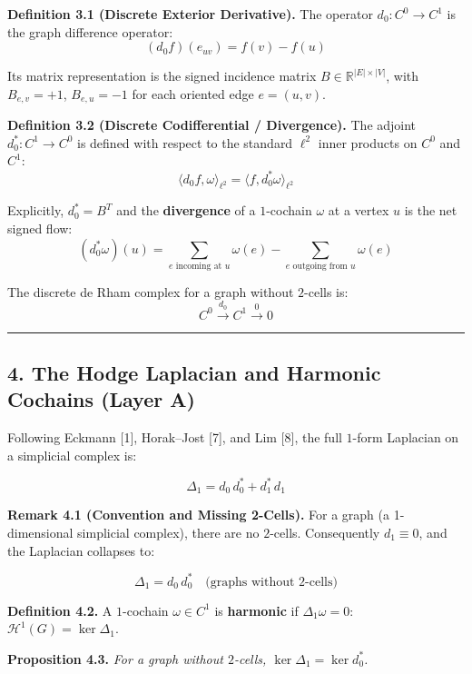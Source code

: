 \documentclass[
]{article}
\begin{document}
\textbf{Definition 3.1 (Discrete Exterior Derivative).} The operator
\(d_0 : C^0 \to C^1\) is the graph difference operator:
\[ (d_0 f)(e_{uv}) = f(v) - f(u) \]

Its matrix representation is the signed incidence matrix
\(B \in \mathbb{R}^{|E| \times |V|}\), with \(B_{e,v} = +1\),
\(B_{e,u} = -1\) for each oriented edge \(e = (u,v)\).

\textbf{Definition 3.2 (Discrete Codifferential / Divergence).} The
adjoint \(d_0^* : C^1 \to C^0\) is defined with respect to the standard
\(\ell^2\) inner products on \(C^0\) and \(C^1\):
\[ \langle d_0 f, \omega \rangle_{\ell^2} = \langle f, d_0^* \omega \rangle_{\ell^2} \]

Explicitly, \(d_0^* = B^T\) and the \textbf{divergence} of a
\(1\)-cochain \(\omega\) at a vertex \(u\) is the net signed flow:
\[ (d_0^* \omega)(u) = \sum_{e \text{ incoming at } u} \omega(e) - \sum_{e \text{ outgoing from } u} \omega(e) \]

The discrete de Rham complex for a graph without \(2\)-cells is:
\[ C^0 \xrightarrow{d_0} C^1 \xrightarrow{0} 0 \]

\begin{center}\rule{0.5\linewidth}{0.5pt}\end{center}

\subsection{\texorpdfstring{4. The Hodge Laplacian and Harmonic Cochains
\textbf{(Layer
A)}}{4. The Hodge Laplacian and Harmonic Cochains (Layer A)}}\label{the-hodge-laplacian-and-harmonic-cochains-layer-a}

Following Eckmann {[}1{]}, Horak--Jost {[}7{]}, and Lim {[}8{]}, the
full \(1\)-form Laplacian on a simplicial complex is:

\[ \Delta_1 = d_0 \, d_0^{*} + d_1^{*} \, d_1 \]

\textbf{Remark 4.1 (Convention and Missing 2-Cells).} For a graph (a
1-dimensional simplicial complex), there are no \(2\)-cells.
Consequently \(d_1 \equiv 0\), and the Laplacian collapses to:

\[ \Delta_1 = d_0 \, d_0^* \quad \text{(graphs without 2-cells)} \]

\textbf{Definition 4.2.} A \(1\)-cochain \(\omega \in C^1\) is
\textbf{harmonic} if \(\Delta_1 \omega = 0\):
\(\mathcal{H}^1(G) = \ker \Delta_1\).

\textbf{Proposition 4.3.} \emph{For a graph without \(2\)-cells,
\(\ker \Delta_1 = \ker d_0^*\).}
\end{document}
